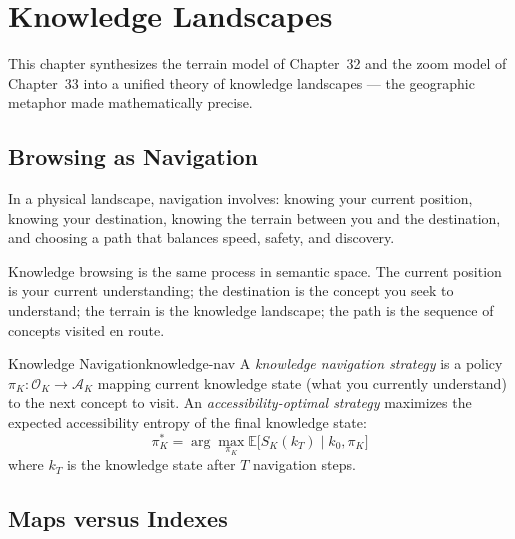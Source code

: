 \chapter{Knowledge Landscapes}



This chapter synthesizes the terrain model of Chapter~32 and the zoom
model of Chapter~33 into a unified theory of knowledge landscapes —
the geographic metaphor made mathematically precise.

\section{Browsing as Navigation}

In a physical landscape, navigation involves: knowing your current position,
knowing your destination, knowing the terrain between you and the destination,
and choosing a path that balances speed, safety, and discovery.

Knowledge browsing is the same process in semantic space. The current
position is your current understanding; the destination is the concept
you seek to understand; the terrain is the knowledge landscape; the path
is the sequence of concepts visited en route.

\begin{definition}{Knowledge Navigation}{knowledge-nav}
  A \emph{knowledge navigation strategy} is a policy $\pi_K :
  \mathcal{O}_K \to \mathcal{A}_K$ mapping current knowledge state
  (what you currently understand) to the next concept to visit.
  An \emph{accessibility-optimal strategy} maximizes the expected
  accessibility entropy of the final knowledge state:
  \[
    \pi_K^* = \arg\max_{\pi_K} \mathbb{E}\bigl[S_K(k_T) \mid k_0, \pi_K\bigr]
  \]
  where $k_T$ is the knowledge state after $T$ navigation steps.
\end{definition}

\section{Maps versus Indexes}

